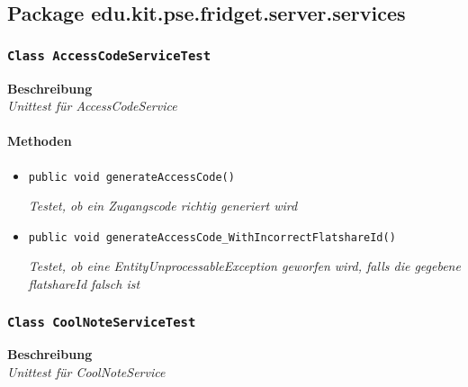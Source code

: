  \newpage
 
 \subsection{Package edu.kit.pse.fridget.server.services}
 \subsubsection{\texttt{Class AccessCodeServiceTest}}
 \textbf{Beschreibung} \\
 \textit{Unittest für AccessCodeService}
 \paragraph*{Methoden}
 \begin{itemize}
    	\item{\texttt{public void generateAccessCode()}}
    	
    	\textit{Testet, ob ein Zugangscode richtig generiert wird}
    	
    	\item{\texttt{public void generateAccessCode\_WithIncorrectFlatshareId()}}
    	
    	\textit{Testet, ob eine EntityUnprocessableException geworfen wird, falls die gegebene flatshareId falsch ist}
 \end{itemize}
 
 \subsubsection{\texttt{Class CoolNoteServiceTest}}
 \textbf{Beschreibung} \\
 \textit{Unittest für CoolNoteService}
